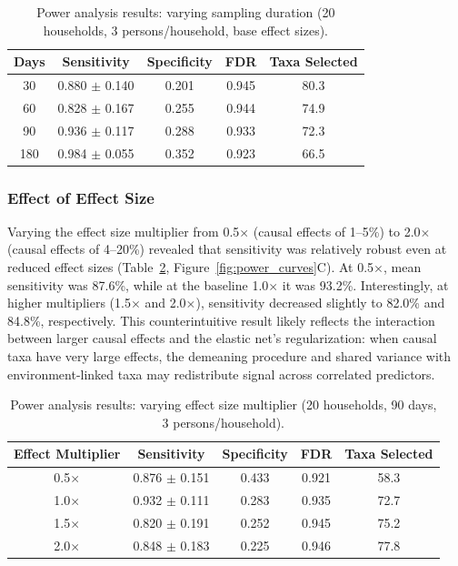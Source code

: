 \documentclass[11pt,letterpaper]{article}
\begin{document}
\begin{table}[H]
\centering
\caption{Power analysis results: varying sampling duration (20 households, 3 persons/household, base effect sizes).}
\label{tab:power_days}
\begin{tabular}{@{}ccccc@{}}
\toprule
Days & Sensitivity & Specificity & FDR & Taxa Selected \\
\midrule
30  & 0.880 $\pm$ 0.140 & 0.201 & 0.945 & 80.3 \\
60  & 0.828 $\pm$ 0.167 & 0.255 & 0.944 & 74.9 \\
90  & 0.936 $\pm$ 0.117 & 0.288 & 0.933 & 72.3 \\
180 & 0.984 $\pm$ 0.055 & 0.352 & 0.923 & 66.5 \\
\bottomrule
\end{tabular}
\end{table}

\subsubsection{Effect of Effect Size}

Varying the effect size multiplier from 0.5$\times$ (causal effects of 1--5\%) to 2.0$\times$ (causal effects of 4--20\%) revealed that sensitivity was relatively robust even at reduced effect sizes (Table~\ref{tab:power_effects}, Figure~\ref{fig:power_curves}C). At 0.5$\times$, mean sensitivity was 87.6\%, while at the baseline 1.0$\times$ it was 93.2\%. Interestingly, at higher multipliers (1.5$\times$ and 2.0$\times$), sensitivity decreased slightly to 82.0\% and 84.8\%, respectively. This counterintuitive result likely reflects the interaction between larger causal effects and the elastic net's regularization: when causal taxa have very large effects, the demeaning procedure and shared variance with environment-linked taxa may redistribute signal across correlated predictors.

\begin{table}[H]
\centering
\caption{Power analysis results: varying effect size multiplier (20 households, 90 days, 3 persons/household).}
\label{tab:power_effects}
\begin{tabular}{@{}ccccc@{}}
\toprule
Effect Multiplier & Sensitivity & Specificity & FDR & Taxa Selected \\
\midrule
0.5$\times$ & 0.876 $\pm$ 0.151 & 0.433 & 0.921 & 58.3 \\
1.0$\times$ & 0.932 $\pm$ 0.111 & 0.283 & 0.935 & 72.7 \\
1.5$\times$ & 0.820 $\pm$ 0.191 & 0.252 & 0.945 & 75.2 \\
2.0$\times$ & 0.848 $\pm$ 0.183 & 0.225 & 0.946 & 77.8 \\
\bottomrule
\end{tabular}
\end{table}
\end{document}
